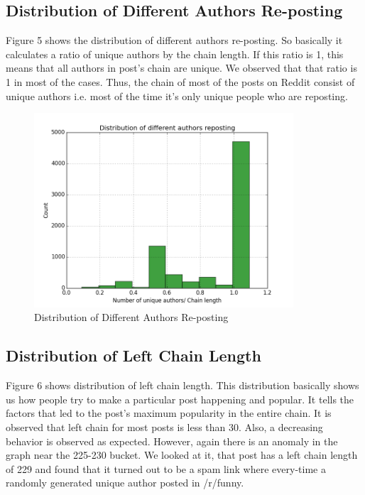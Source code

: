 \documentclass{article} %
\begin{document}
\subsection{Distribution of Different Authors Re-posting}

Figure 5 shows the distribution of different authors re-posting. So basically it calculates a ratio of unique authors by the chain length. If this ratio is 1, this means that all authors in post's chain are unique. We observed that that ratio is 1 in most of the cases. Thus, the chain of most of the posts on Reddit consist of unique authors i.e. most of the time it's only unique people who are reposting. 

\begin{figure}[h]
\begin{center}
\includegraphics[width=3.8in]{unique_authors.png}
\caption{Distribution of Different Authors Re-posting}
\end{center}
\end{figure}

\newpage

\subsection{Distribution of Left Chain Length}

Figure 6 shows distribution of left chain length. This distribution basically shows us how people try to make a particular post happening and popular. It tells the factors that led to the post's maximum popularity in the entire chain. It is observed that left chain for most posts is less than 30. Also, a decreasing behavior is observed as expected. However, again there is an anomaly in the graph near the 225-230 bucket. We looked at it, that post has a left chain length of 229 and found that it turned out to be a spam link where every-time a randomly generated unique author posted in /r/funny.
\end{document}
